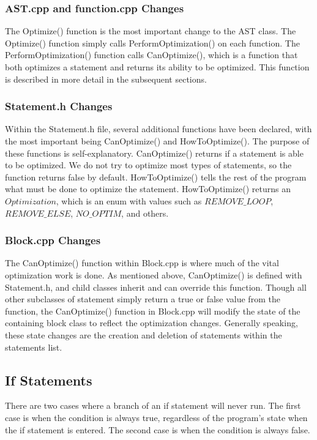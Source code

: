 \documentclass[sigconf]{acmart}
\begin{document}
\subsubsection{AST.cpp and function.cpp Changes}
The Optimize() function is the most important change to the AST class. The Optimize() function simply 
calls PerformOptimization() on each function. The PerformOptimization() function calls CanOptimize(), which is a function 
that both optimizes a statement and returns its ability to be optimized. This function is described in more detail in the 
subsequent sections.

\subsubsection{Statement.h Changes}
Within the Statement.h file, several additional functions have been declared, with the most important being 
CanOptimize() and HowToOptimize(). The purpose of these functions is self-explanatory. CanOptimize()
returns if a statement is able to be optimized. We do not try to optimize most types of statements,
so the function returns false by default. HowToOptimize() tells the rest of the program what must be done to optimize 
the statement. HowToOptimize() returns an $Optimization$, which is an enum with values such as $REMOVE\_LOOP$, $REMOVE\_ELSE$, $NO\_OPTIM$,
and others. 

\subsubsection{Block.cpp Changes}
The CanOptimize() function within Block.cpp is where much of the vital optimization work is done.
As mentioned above, CanOptimize() is defined with Statement.h, and child classes inherit and can override this function.
Though all other subclasses of statement simply return a true or false value from the function, the CanOptimize() function 
in Block.cpp will modify the state of the containing block class to reflect the optimization changes. Generally speaking, 
these state changes are the creation and deletion of statements within the statements list.

\subsection{If Statements}
There are two cases where a branch of an if statement will never run. The first case is when the condition 
is always true, regardless of the program's state when the if statement is entered. The second case is when 
the condition is always false.
\end{document}
